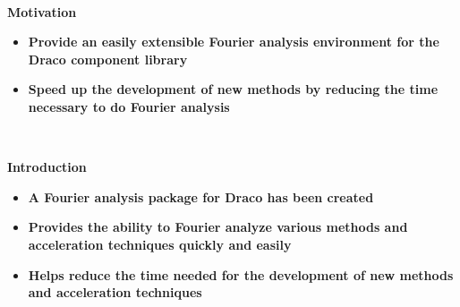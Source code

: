 \baselineskip=0.29in

\newpage

\mbox{ }
\vskip0.5in
{\Huge
\begin{center}
{\bf Motivation} 
\end{center}
}
\vskip0.5in
\noindent
{\Huge
\begin{itemize}
 \item {\bf Provide an easily extensible Fourier analysis 
            environment for the Draco component library}
 \item {\bf Speed up the development of new methods
            by reducing the time necessary to do Fourier analysis}
\end{itemize}
}
\vskip2.0in


\baselineskip=0.29in

\newpage


\mbox{ }
\vskip0.5in
{\Huge
\begin{center}
{\bf Introduction}
\end{center}
}
\vskip0.5in
{\Huge
\begin{itemize}
 \item {\bf A Fourier analysis package for Draco has been created}
 \item {\bf Provides the ability to Fourier analyze various methods
            and acceleration techniques quickly and easily}
 \item {\bf Helps reduce the time needed 
            for the development of new methods and acceleration techniques}
\end{itemize}
}
\vskip2.0in
